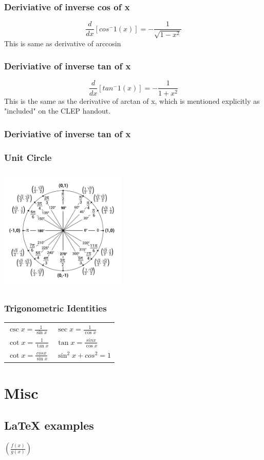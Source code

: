 \documentclass[12pt, letterpaper]{article}
\newcommand\T{\rule{0pt}{8mm}}       %
\begin{document}
\subsubsection{Deriviative of inverse cos of x}
\[\frac{d}{dx}[cos^-1(x)] = - \frac{1}{\sqrt{1 - x^2}}\]
This is same as derivative of arccosin
\subsubsection{Deriviative of inverse tan of x}
\[\frac{d}{dx}[tan^-1(x)] = - \frac{1}{1 + x^2}\]
This is the same as the derivative of arctan of x, which is mentioned explicitly as "included" on the CLEP handout.

\subsubsection{Deriviative of inverse tan of x}

\subsubsection{Unit Circle}
\includegraphics[width=6cm, height=6cm]{unit-circle.png}
\subsubsection{Trigonometric Identities}

\begin{center}
    \begin{tabular}{  p{5cm}  p{5cm} }
        $\csc x = \frac{1}{\sin x }$ & 
        $\sec x = \frac{1}{\cos x }$ \T \\
        
        $\cot x = \frac{1}{\tan x }$ & 
        $\tan x = \frac{sin x}{\cos x }$ \T \\
        $\cot x = \frac{cos x}{\sin x }$ & 
        $\sin^2 x + cos^2 = 1$ \T \\

\end{tabular}
\end{center}
\vspace{1cm}
\section{Misc}
\subsection{LaTeX examples}
$(\frac{f(x)}{g(x)})$
\end{document}
